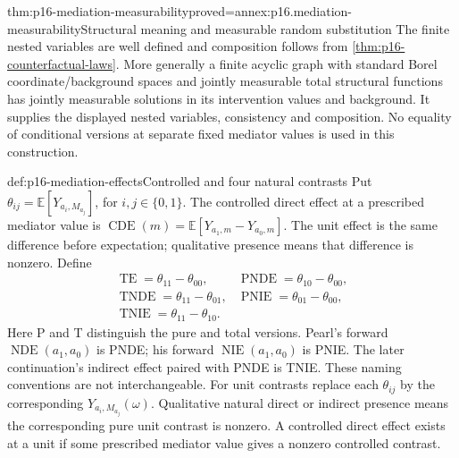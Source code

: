 \begin{hbtheorem}{thm:p16-mediation-measurability}{proved=annex:p16.mediation-measurability}{Structural meaning and measurable random substitution}
The finite nested variables are well defined and composition follows from
\cref{thm:p16-counterfactual-laws}. More generally a finite acyclic graph
with standard Borel coordinate/background spaces and jointly measurable
total structural functions has jointly measurable solutions in its
intervention values and background. It supplies the displayed nested
variables, consistency and composition. No equality of conditional versions
at separate fixed mediator values is used in this construction.
\end{hbtheorem}

\begin{hbdefinition}{def:p16-mediation-effects}{Controlled and four natural contrasts}
Put \(\theta_{ij}=\mathbb E[Y_{a_i,M_{a_j}}]\), for \(i,j\in\{0,1\}\).
The controlled direct effect at a prescribed mediator value is
\(\operatorname{CDE}(m)=\mathbb E[Y_{a_1,m}-Y_{a_0,m}]\).
The unit effect is the same difference before expectation; qualitative
presence means that difference is nonzero. Define
\[
\begin{array}{ll}
 \operatorname{TE}=\theta_{11}-\theta_{00},&
 \operatorname{PNDE}=\theta_{10}-\theta_{00},\\
 \operatorname{TNDE}=\theta_{11}-\theta_{01},&
 \operatorname{PNIE}=\theta_{01}-\theta_{00},\\
 \operatorname{TNIE}=\theta_{11}-\theta_{10}.&
\end{array}
\]
Here P and T distinguish the pure and total versions. Pearl's forward
\(\operatorname{NDE}(a_1,a_0)\) is PNDE; his forward
\(\operatorname{NIE}(a_1,a_0)\) is PNIE. The later continuation's indirect
effect paired with PNDE is TNIE. These naming conventions are not interchangeable.
For unit contrasts replace each \(\theta_{ij}\) by the corresponding
\(Y_{a_i,M_{a_j}}(\omega)\). Qualitative natural direct or indirect
presence means the corresponding pure unit contrast is nonzero. A
controlled direct effect exists at a unit if some prescribed mediator
value gives a nonzero controlled contrast.
\end{hbdefinition}

